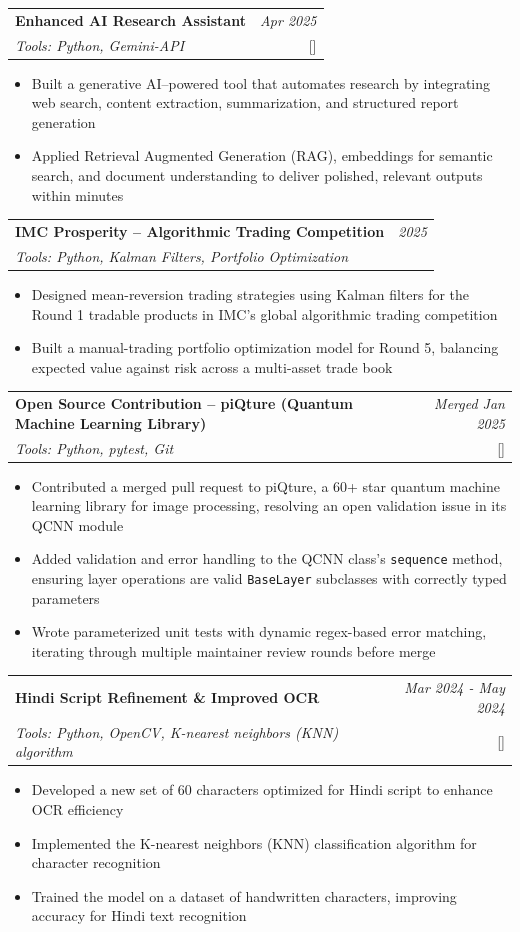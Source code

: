\documentclass[a4paper,11pt]{article}
\makeatletter
\newcommand{\resumeProject}[4]{
\vspace{0.5mm}\item
    \begin{tabular*}{0.98\textwidth}[t]{l@{\extracolsep{\fill}}r}
        \textbf{#1} & \textit{\footnotesize{#3}} \\
        \footnotesize{\textit{#2}} & \footnotesize{#4}
    \end{tabular*}
    \vspace{-2.4mm}
}
\newcommand{\resumeItemListStart}{\begin{itemize}[leftmargin=*,labelsep=1mm,itemsep=0.5mm]}
\newcommand{\resumeItemListEnd}{\end{itemize}\vspace{-2mm}}
\makeatother
\begin{document}
\resumeProject
  {Enhanced AI Research Assistant}
  {Tools: Python, Gemini-API}
  {Apr 2025}
  {{}[\href{https://www.kaggle.com/code/amansingh2116/research-assistant}{\textcolor{darkblue}{\faGithub}}]}
\resumeItemListStart
  \item Built a generative AI–powered tool that automates research by integrating web search, content extraction, summarization, and structured report generation
  \item Applied Retrieval Augmented Generation (RAG), embeddings for semantic search, and document understanding to deliver polished, relevant outputs within minutes
\resumeItemListEnd

\resumeProject
  {IMC Prosperity -- Algorithmic Trading Competition}
  {Tools: Python, Kalman Filters, Portfolio Optimization}
  {2025}
  {{}}
\resumeItemListStart
  \item Designed mean-reversion trading strategies using Kalman filters for the Round 1 tradable products in IMC's global algorithmic trading competition
  \item Built a manual-trading portfolio optimization model for Round 5, balancing expected value against risk across a multi-asset trade book
\resumeItemListEnd

\resumeProject
  {Open Source Contribution -- piQture (Quantum Machine Learning Library)}
  {Tools: Python, pytest, Git}
  {Merged Jan 2025}
  {{}[\href{https://github.com/SaashaJoshi/piQture/pull/147}{\textcolor{darkblue}{\faGithub}}]}
\resumeItemListStart
  \item Contributed a merged pull request to piQture, a 60+ star quantum machine learning library for image processing, resolving an open validation issue in its QCNN module
  \item Added validation and error handling to the QCNN class's \texttt{sequence} method, ensuring layer operations are valid \texttt{BaseLayer} subclasses with correctly typed parameters
  \item Wrote parameterized unit tests with dynamic regex-based error matching, iterating through multiple maintainer review rounds before merge
\resumeItemListEnd

\resumeProject
  {Hindi Script Refinement \& Improved OCR}
  {Tools: Python, OpenCV, K-nearest neighbors (KNN) algorithm}
  {Mar 2024 - May 2024}
  {{}[\href{https://github.com/amansingh2116/hindi_ocr_revised}{\textcolor{darkblue}{\faGithub}}]}
\resumeItemListStart
  \item Developed a new set of 60 characters optimized for Hindi script to enhance OCR efficiency
  \item Implemented the K-nearest neighbors (KNN) classification algorithm for character recognition
  \item Trained the model on a dataset of handwritten characters, improving accuracy for Hindi text recognition
\resumeItemListEnd
\end{document}
